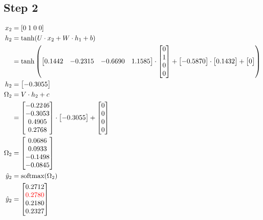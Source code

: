 \documentclass{article}
\begin{document}
\subsection{Step 2}
\begin{align*}
    x_2 & = [0 \; 1\; 0\; 0] \\
    h_2 & = \tanh(U \cdot x_2 + W \cdot h_1 + b) \\
    & = \tanh\left(\begin{bmatrix} 0.1442 & -0.2315 & -0.6690 & 1.1585 \end{bmatrix} \cdot \begin{bmatrix} 0 \\ 1 \\ 0 \\ 0 \end{bmatrix} + \begin{bmatrix} -0.5870 \end{bmatrix} \cdot \begin{bmatrix} 0.1432 \end{bmatrix} + \begin{bmatrix} 0 \end{bmatrix}\right) \\
    h_2 & = \begin{bmatrix} -0.3055 \end{bmatrix} \\
    \Omega_2 & = V \cdot h_2 + c \\
    & = \begin{bmatrix} -0.2246 \\ -0.3053 \\ 0.4905 \\ 0.2768 \end{bmatrix} \cdot \begin{bmatrix} -0.3055 \end{bmatrix} + \begin{bmatrix} 0 \\ 0 \\ 0 \\ 0 \end{bmatrix} \\
    \Omega_2& = \begin{bmatrix} 0.0686 \\ 0.0933 \\ -0.1498 \\ -0.0845 \end{bmatrix} \\
    \hat{y}_2 & = \text{softmax}(\Omega_2) \\
    \hat{y}_2& = \begin{bmatrix} 0.2712 \\ \textcolor{red}{0.2780} \\ 0.2180 \\ 0.2327 \end{bmatrix} \\
\end{align*}
\end{document}
